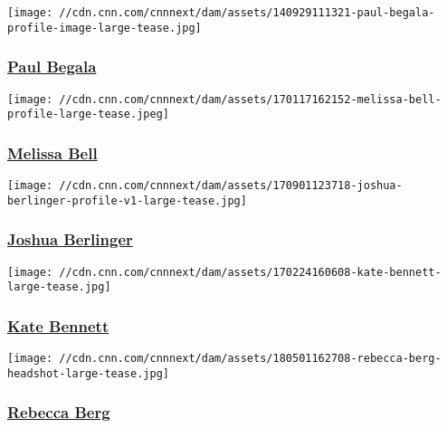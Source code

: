 \href{/profiles/paul-begala}{}

\texttt{[image: //cdn.cnn.com/cnnnext/dam/assets/140929111321-paul-begala-profile-image-large-tease.jpg]}

\hypertarget{paul-begala}{%
\subsubsection{\texorpdfstring{\href{/profiles/paul-begala}{Paul
Begala}}{Paul Begala}}\label{paul-begala}}

\href{/profiles/melissa-bell}{}

\texttt{[image: //cdn.cnn.com/cnnnext/dam/assets/170117162152-melissa-bell-profile-large-tease.jpeg]}

\hypertarget{melissa-bell}{%
\subsubsection{\texorpdfstring{\href{/profiles/melissa-bell}{Melissa
Bell}}{Melissa Bell}}\label{melissa-bell}}

\href{/profiles/joshua-berlinger}{}

\texttt{[image: //cdn.cnn.com/cnnnext/dam/assets/170901123718-joshua-berlinger-profile-v1-large-tease.jpg]}

\hypertarget{joshua-berlinger}{%
\subsubsection{\texorpdfstring{\href{/profiles/joshua-berlinger}{Joshua
Berlinger}}{Joshua Berlinger}}\label{joshua-berlinger}}

\href{/profiles/kate-bennett}{}

\texttt{[image: //cdn.cnn.com/cnnnext/dam/assets/170224160608-kate-bennett-large-tease.jpg]}

\hypertarget{kate-bennett}{%
\subsubsection{\texorpdfstring{\href{/profiles/kate-bennett}{Kate
Bennett}}{Kate Bennett}}\label{kate-bennett}}

\href{/profiles/rebecca-berg-profile}{}

\texttt{[image: //cdn.cnn.com/cnnnext/dam/assets/180501162708-rebecca-berg-headshot-large-tease.jpg]}

\hypertarget{rebecca-berg}{%
\subsubsection{\texorpdfstring{\href{/profiles/rebecca-berg-profile}{Rebecca
Berg}}{Rebecca Berg}}\label{rebecca-berg}}

